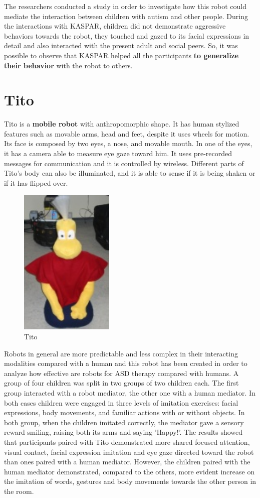 The researchers conducted a study\cite{dautenhahn2009kaspar} in order to investigate how this robot could mediate the interaction between children with autism
and other people. During the interactions with KASPAR, children did not demonstrate aggressive behaviors towards the robot, they touched and gazed to its facial expressions in detail and also interacted with the present adult and social peers. So, it was possible to observe that KASPAR helped all the participants \textbf{to generalize their behavior} with the robot to others.

\section{Tito}
Tito\cite{duquette2008exploring} is a \textbf{mobile robot} with anthropomorphic shape. It has human stylized features such as movable arms, head and feet, despite it uses wheels for motion. Its face is composed by two eyes, a nose, and movable mouth. In one of the eyes, it has a camera able to measure eye gaze toward him. It uses pre-recorded messages for communication and it is controlled by wireless. Different parts of
Tito’s body can also be illuminated, and it is able to sense if it is being shaken or if it has flipped over.
\begin{figure}[h]
	\centering
	\includegraphics[width=0.4\textwidth]{tito}
	\caption{Tito}
	\label{fig:Keepon}
\end{figure}
Robots in general are more predictable and
less complex in their interacting modalities compared with a human and this robot has been created in order to analyze how effective are robots for ASD therapy compared with humans. A group of four children was split in two groups of two children each. The first group interacted with a robot mediator, the other one with a human mediator. In both cases children were engaged in three levels of imitation exercises: facial expressions, body movements, and familiar actions with or without objects. In both group, when the children imitated correctly, the mediator gave a sensory reward smiling, raising both its arms and saying 'Happy!'. The results showed that participants paired with Tito demonstrated more shared focused attention, visual contact, facial expression imitation and eye gaze directed toward the robot than ones paired with a human mediator. However, the children paired with the human mediator demonstrated, compared to the others, more evident increase on the imitation of words, gestures and body movements towards the other person in the room. 
